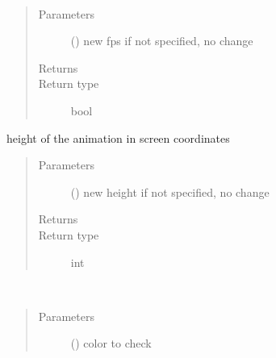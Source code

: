 \documentclass[letterpaper,10pt,english]{sphinxmanual}
\begin{document}
\begin{fulllineitems}
\begin{fulllineitems}
\end{fulllineitems}


\begin{fulllineitems}
\label{\detokenize{Reference:salabim.Environment.fps}}~\begin{quote}\begin{description}
\item[{Parameters}] \leavevmode
{} () \textendash{} new fps 
if not specified, no change

\item[{Returns}] \leavevmode
{}

\item[{Return type}] \leavevmode
bool

\end{description}\end{quote}

\end{fulllineitems}


\begin{fulllineitems}
\label{\detokenize{Reference:salabim.Environment.height}}
height of the animation in screen coordinates
\begin{quote}\begin{description}
\item[{Parameters}] \leavevmode
{} () \textendash{} new height 
if not specified, no change

\item[{Returns}] \leavevmode
{}

\item[{Return type}] \leavevmode
int

\end{description}\end{quote}

\end{fulllineitems}


\begin{fulllineitems}
\label{\detokenize{Reference:salabim.Environment.is_dark}}~\begin{quote}\begin{description}
\item[{Parameters}] \leavevmode
{} () \textendash{} color to check


\end{description}
\end{quote}
\end{fulllineitems}
\end{fulllineitems}
\end{document}

